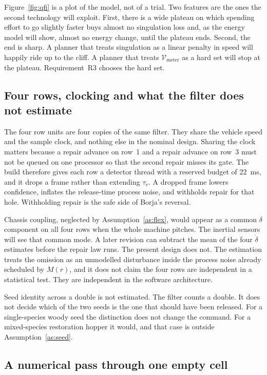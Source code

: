Figure~\ref{fig:qfi} is a plot of the model, not of a trial. Two features are the ones the second technology will exploit. First, there is a wide plateau on which spending effort to go slightly faster buys almost no singulation loss and, as the energy model will show, almost no energy change, until the plateau ends. Second, the end is sharp. A planner that treats singulation as a linear penalty in speed will happily ride up to the cliff. A planner that treats \(\mathcal{V}_{\mathrm{meter}}\) as a hard set will stop at the plateau. Requirement~R3 chooses the hard set.

\subsection{Four rows, clocking and what the filter does not estimate}

The four row units are four copies of the same filter. They share the vehicle speed and the sample clock, and nothing else in the nominal design. Sharing the clock matters because a repair advance on row~1 and a repair advance on row~3 must not be queued on one processor so that the second repair misses its gate. The build therefore gives each row a detector thread with a reserved budget of \SI{22}{ms}, and it drops a frame rather than extending \(\tau_v\). A dropped frame lowers confidence, inflates the release-time process noise, and withholds repair for that hole. Withholding repair is the safe side of Borja's reversal.

Chassis coupling, neglected by Assumption~\ref{as:flex}, would appear as a common \(\delta\) component on all four rows when the whole machine pitches. The inertial sensors will see that common mode. A later revision can subtract the mean of the four \(\dot{\delta}\) estimates before the repair law runs. The present design does not. The estimation treats the omission as an unmodelled disturbance inside the process noise already scheduled by \(M(r)\), and it does not claim the four rows are independent in a statistical test. They are independent in the software architecture.

Seed identity across a double is not estimated. The filter counts a double. It does not decide which of the two seeds is the one that should have been released. For a single-species woody seed the distinction does not change the command. For a mixed-species restoration hopper it would, and that case is outside Assumption~\ref{as:seed}.

\subsection{A numerical pass through one empty cell}

